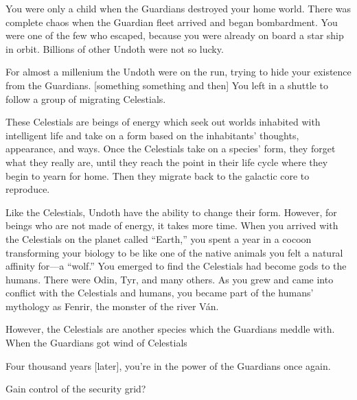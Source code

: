 \documentclass[char]{guardians}
\begin{document}

You were only a child when the Guardians destroyed your home world. There was complete chaos when the Guardian fleet arrived and began bombardment. You were one of the few who escaped, because you were already on board a star ship in orbit. Billions of other Undoth were not so lucky.


For almost a millenium the Undoth were on the run, trying to hide your existence from the Guardians. [something something and then]
You left in a shuttle to follow a group of migrating Celestials.

These Celestials are beings of energy which seek out worlds inhabited with intelligent life and take on a form based on the inhabitants' thoughts, appearance, and ways. Once the Celestials take on a species' form, they forget what they really are, until they reach the point in their life cycle where they begin to yearn for home. Then they migrate back to the galactic core to reproduce.

Like the Celestials, Undoth have the ability to change their form. However, for beings who are not made of energy, it takes more time. When you arrived with the Celestials on the planet called ``Earth,'' you spent a year in a cocoon transforming your biology to be like one of the native animals you felt a natural affinity for---a ``wolf.'' You emerged to find the Celestials had become gods to the humans. There were Odin, Tyr, and many others. As you grew and came into conflict with the Celestials and humans, you became part of the humans' mythology as Fenrir, the monster of the river V\'an.

However, the Celestials are another species which the Guardians meddle with. When the Guardians got wind of Celestials 

Four thousand years [later], you're in the power of the Guardians once again.

Gain control of the security grid?

\end{document}
